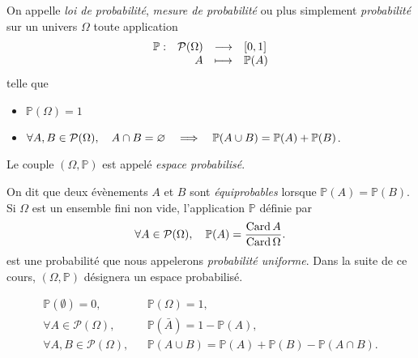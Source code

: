 \documentclass{magnolia}
\begin{document}

\begin{definition}
On appelle \emph{loi de probabilité}, \emph{mesure de probabilité} ou plus simplement \emph{probabilité} sur un univers $\Omega$
toute application
\[\begin{array}[t]{lrcl} \displaystyle{\mathbb{P}} : & \displaystyle{\mathcal{P}(\Omega)} & \longrightarrow & \displaystyle{\left[0,1\right]} \\ & \displaystyle{A} & \longmapsto & \displaystyle{\mathbb{P}(A)} \end{array}\]
telle que
\begin{itemize}
\item $\mathbb{P}(\Omega)=1$
\item $\forall A,B\in\mathcal{P}(\Omega),\quad A\cap B=\varnothing \quad\Longrightarrow\quad
  \mathbb{P}(A\cup B)=\mathbb{P}(A)+\mathbb{P}(B)$.
\end{itemize}
Le couple $(\Omega,\mathbb{P})$ est appelé \emph{espace probabilisé}.
\end{definition}

\begin{remarques}
\remarque On dit que deux évènements $A$ et $B$ sont \emph{équiprobables}
  lorsque $\mathbb{P}(A)=\mathbb{P}(B)$.
\remarque Si $\Omega$ est un ensemble fini non vide, l'application $\mathbb{P}$ définie par
\[\forall A\in\mathcal{P}(\Omega),\quad \mathbb{P}(A)=\frac{\operatorname{Card} A}{\operatorname{Card} \Omega}.\]  
est une probabilité que nous appelerons \emph{probabilité uniforme}.
\remarque Dans la suite de ce cours, $(\Omega,\mathbb{P})$ désignera un espace probabilisé.
\end{remarques}



\begin{proposition}
\begin{eqnarray*}
\mathbb{P}(\emptyset)=0,& &\mathbb{P}(\Omega)=1,\\
\forall A\in\mathcal{P}(\Omega),& &\mathbb{P}(\bar{A})=1-\mathbb{P}(A),\\
\forall A,B\in\mathcal{P}(\Omega),& &\mathbb{P}(A\cup B)=\mathbb{P}(A)+\mathbb{P}(B)-\mathbb{P}(A\cap B).
\end{eqnarray*}
\end{proposition}
\end{document}
